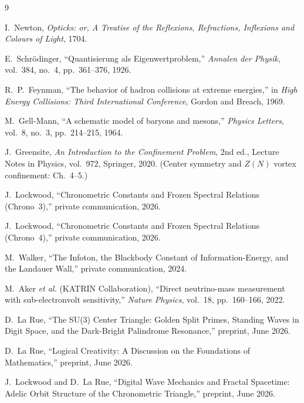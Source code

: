 \begin{thebibliography}{9}

I.~Newton, \emph{Opticks: or, A Treatise of the Reflexions, Refractions, Inflexions and Colours of Light}, 1704.

E.~Schr\"odinger, ``Quantisierung als Eigenwertproblem,'' \emph{Annalen der Physik}, vol.~384, no.~4, pp.~361--376, 1926.

R.~P.~Feynman, ``The behavior of hadron collisions at extreme energies,'' in \emph{High Energy Collisions: Third International Conference}, Gordon and Breach, 1969.

M.~Gell-Mann, ``A schematic model of baryons and mesons,'' \emph{Physics Letters}, vol.~8, no.~3, pp.~214--215, 1964.

J.~Greensite, \emph{An Introduction to the Confinement Problem}, 2nd ed., Lecture Notes in Physics, vol.~972, Springer, 2020. (Center symmetry and $Z(N)$ vortex confinement: Ch.~4--5.)

J.~Lockwood, ``Chronometric Constants and Frozen Spectral Relations (Chrono~3),'' private communication, 2026.

J.~Lockwood, ``Chronometric Constants and Frozen Spectral Relations (Chrono~4),'' private communication, 2026.

M.~Walker, ``The Infoton, the Blackbody Constant of Information-Energy, and the Landauer Wall,'' private communication, 2024.

M.~Aker \emph{et al.} (KATRIN Collaboration), ``Direct neutrino-mass measurement with sub-electronvolt sensitivity,'' \emph{Nature Physics}, vol.~18, pp.~160--166, 2022.

D.~La Rue, ``The SU(3) Center Triangle: Golden Split Primes, Standing Waves in Digit Space, and the Dark-Bright Palindrome Resonance,'' preprint, June 2026.

D.~La Rue, ``Logical Creativity: A Discussion on the Foundations of Mathematics,'' preprint, June 2026.

J.~Lockwood and D.~La Rue, ``Digital Wave Mechanics and Fractal Spacetime: Adelic Orbit Structure of the Chronometric Triangle,'' preprint, June 2026.

\end{thebibliography}
